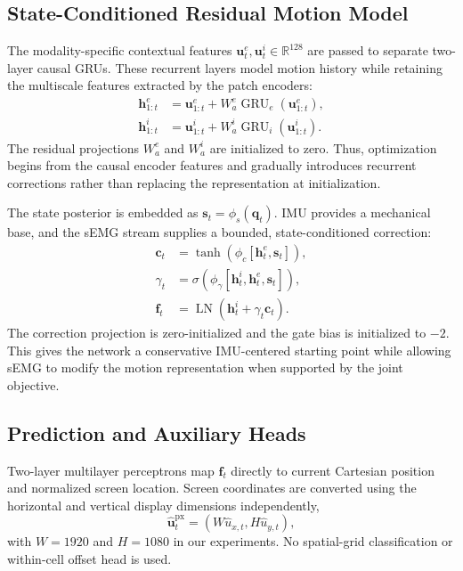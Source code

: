 \subsection{State-Conditioned Residual Motion Model}
\label{subsec:motion}

The modality-specific contextual features
$\mathbf u_t^e,\mathbf u_t^i\in\mathbb{R}^{128}$ are passed to separate
two-layer causal GRUs. These recurrent layers model motion history while
retaining the multiscale features extracted by the patch encoders:
\begin{align}
 \mathbf h_{1:t}^{e}&=\mathbf u_{1:t}^{e}
 +W_a^e\operatorname{GRU}_e(\mathbf u_{1:t}^{e}),\\
 \mathbf h_{1:t}^{i}&=\mathbf u_{1:t}^{i}
 +W_a^i\operatorname{GRU}_i(\mathbf u_{1:t}^{i}).
\end{align}
The residual projections $W_a^e$ and $W_a^i$ are initialized to zero. Thus,
optimization begins from the causal encoder features and gradually introduces
recurrent corrections rather than replacing the representation at
initialization.

The state posterior is embedded as $\mathbf s_t=\phi_s(\mathbf q_t)$. IMU
provides a mechanical base, and the sEMG stream supplies a bounded,
state-conditioned correction:
\begin{align}
 \mathbf c_t&=\tanh\!\left(\phi_c
 [\mathbf h_t^e,\mathbf s_t]\right),\\
 \gamma_t&=\sigma\!\left(\phi_\gamma
 [\mathbf h_t^i,\mathbf h_t^e,\mathbf s_t]\right),\\
 \mathbf f_t&=\operatorname{LN}
 (\mathbf h_t^i+\gamma_t\mathbf c_t).
\end{align}
The correction projection is zero-initialized and the gate bias is initialized
to $-2$. This gives the network a conservative IMU-centered starting point
while allowing sEMG to modify the motion representation when supported by the
joint objective.

\subsection{Prediction and Auxiliary Heads}

Two-layer multilayer perceptrons map $\mathbf f_t$ directly to current
Cartesian position and normalized screen location. Screen coordinates are
converted using the horizontal and vertical display dimensions independently,
\begin{equation}
    \hat{\mathbf u}_t^{\mathrm{px}}
    =(W\hat u_{x,t},H\hat u_{y,t}),
\end{equation}
with $W=1920$ and $H=1080$ in our experiments. No spatial-grid classification
or within-cell offset head is used.


